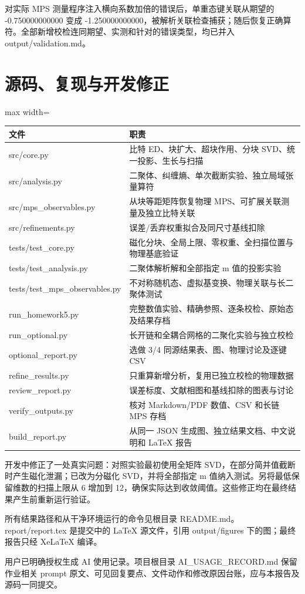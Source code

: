\documentclass[zihao=5,a4paper]{ctexart}
\begin{document}
对实际 MPS 测量程序注入横向系数加倍的错误后，单重态键关联从期望的 -0.750000000000 变成 -1.250000000000，被解析关联检查捕获；随后恢复正确算符。全部新增校检连同期望、实测和针对的错误类型，均已并入 output/validation.md。


\section{源码、复现与开发修正}

\begin{center}
\small
\begin{adjustbox}{max width=\linewidth}
\begin{tabular}{ll}
\toprule
文件 & 职责 \\
\midrule
src/core.py & 比特 ED、块扩大、超块作用、分块 SVD、统一投影、生长与扫描 \\
src/analysis.py & 二聚体、纠缠熵、单次截断实验、独立局域张量算符 \\
src/mps\_observables.py & 从块等距矩阵恢复物理 MPS、可扩展关联测量及独立比特关联 \\
src/refinements.py & 误差/丢弃权重拟合及同尺寸基线扣除 \\
tests/test\_core.py & 磁化分块、全局上限、零权重、全扫描位置与物理基底验证 \\
tests/test\_analysis.py & 二聚体解析解和全部指定 m 值的投影实验 \\
tests/test\_mps\_observables.py & 不对称随机态、虚拟基变换、物理关联与长二聚体测试 \\
run\_homework5.py & 完整数值实验、精确参照、逐条校检、原始态及结果存档 \\
run\_optional.py & 长开链和全耦合网格的二聚化实验与独立校检 \\
optional\_report.py & 选做 3/4 同源结果表、图、物理讨论及逐键 CSV \\
refine\_results.py & 只重算新增分析，复用已独立校检的物理数据 \\
review\_report.py & 误差标度、文献相图和基线扣除的图表与讨论 \\
verify\_outputs.py & 核对 Markdown/PDF 数值、CSV 和长链 MPS 存档 \\
build\_report.py & 从同一 JSON 生成图、独立结果文档、中文说明和 LaTeX 报告 \\
\bottomrule
\end{tabular}
\end{adjustbox}
\end{center}

开发中修正了一处真实问题：对照实验最初使用全矩阵 SVD，在部分简并值截断时产生磁化泄漏；已改为分磁化 SVD，并将全部指定 m 值纳入测试。另将最低保留维数的扫描上限从 6 增加到 12，确保实际达到收敛阈值。这些修正均在最终结果产生前重新运行验证。


所有结果路径和从干净环境运行的命令见根目录 README.md。report/report.tex 是提交中的 LaTeX 源文件，引用 output/figures 下的图；最终报告只经 XeLaTeX 编译。


用户已明确授权生成 AI 使用记录。项目根目录 AI\_USAGE\_RECORD.md 保留作业相关 prompt 原文、可见回复要点、文件动作和修改原因台账，应与本报告及源码一同提交。
\end{document}
